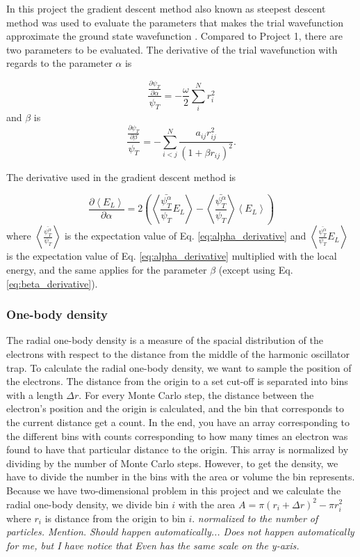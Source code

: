 In this project the gradient descent method also known as steepest descent method  was used to evaluate the parameters that makes the trial wavefunction approximate the ground state wavefunction \cite{gradient_descent}. Compared to Project 1, there are two parameters to be evaluated. The derivative of the trial wavefunction with regards to the parameter $\alpha$ is 

\begin{equation}\label{eq:alpha_derivative}
\frac{\frac{\partial \psi_T}{\partial \alpha}}{\psi_T} = -\frac{\omega}{2}\sum_i^N r_i^2
\end{equation}
and $\beta$ is
\begin{equation}\label{eq:beta_derivative}
\frac{\frac{\partial \psi_T}{\partial \beta}}{\psi_T} = - \sum_{i<j}^N \frac{a_{ij}r_{ij}^2}{(1+\beta r_{ij})^2}.
\end{equation}

The derivative used in the gradient descent method is 

\begin{equation}
\frac{\partial \left< E_L \right>}{\partial \alpha} = 2  \left( \left<\frac{\bar{\psi_T^{\alpha}}}{\psi_T}E_L\right> -\left<\frac{\bar{\psi_T^{\alpha}}}{\psi_T}\right>\left<E_L\right> \right)
\end{equation}
where $\left<\frac{\bar{\psi_T^{\alpha}}}{\psi_T}\right>$ is the expectation value of Eq. \ref{eq:alpha_derivative} and $\left<\frac{\bar{\psi_T^{\alpha}}}{\psi_T}E_L\right>$ is the expectation value of Eq. \ref{eq:alpha_derivative} multiplied with the local energy, and the same applies for the parameter $\beta$ (except using Eq. \ref{eq:beta_derivative}). 

\subsubsection{One-body density}

The radial one-body density is a measure of the spacial distribution of the electrons with respect to the distance from the middle of the harmonic oscillator trap. To calculate the radial one-body density, we want to sample the position of the electrons. The distance from the origin to a set cut-off is separated into bins with a length $\Delta r$. For every Monte Carlo step, the distance between the electron's position and the origin is calculated, and the bin that corresponds to the current distance get a count. In the end, you have an array corresponding to the different bins with counts corresponding to how many times an electron was found to have that particular distance to the origin. This array is normalized by dividing by the number of Monte Carlo steps. However, to get the density, we have to divide the number in the bins with the area or volume the bin represents. Because we have two-dimensional problem in this project and we calculate the radial one-body density, we divide bin $i$ with the area $ A = \pi (r_i+\Delta r)^2 - \pi r_i^2$ where $r_i$ is distance from the origin to bin $i$. \textit{normalized to the number of particles. Mention. Should happen automatically... Does not happen automatically for me, but I have notice that Even has the same scale on the y-axis.}\cite{Evens_master}

